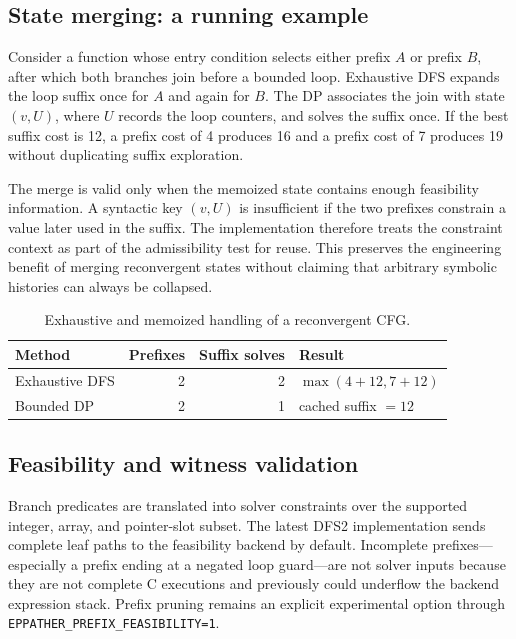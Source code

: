 \documentclass[10pt,conference]{IEEEtran}
\newcommand{\code}[1]{\texttt{#1}}
\begin{document}
\subsection{State merging: a running example}
Consider a function whose entry condition selects either prefix $A$ or prefix $B$, after which both branches join before a bounded loop. Exhaustive DFS expands the loop suffix once for $A$ and again for $B$. The DP associates the join with state $(v,U)$, where $U$ records the loop counters, and solves the suffix once. If the best suffix cost is 12, a prefix cost of 4 produces 16 and a prefix cost of 7 produces 19 without duplicating suffix exploration.

The merge is valid only when the memoized state contains enough feasibility information. A syntactic key $(v,U)$ is insufficient if the two prefixes constrain a value later used in the suffix. The implementation therefore treats the constraint context as part of the admissibility test for reuse. This preserves the engineering benefit of merging reconvergent states without claiming that arbitrary symbolic histories can always be collapsed.

\begin{table}[t]
\centering
\caption{Exhaustive and memoized handling of a reconvergent CFG.}
\label{tab:merge-example}
\begin{tabular}{lrrl}
\toprule
Method & Prefixes & Suffix solves & Result\\
\midrule
Exhaustive DFS & 2 & 2 & $\max(4+12,7+12)$\\
Bounded DP & 2 & 1 & cached suffix $=12$\\
\bottomrule
\end{tabular}
\end{table}

\subsection{Feasibility and witness validation}
Branch predicates are translated into solver constraints over the supported integer, array, and pointer-slot subset. The latest DFS2 implementation sends complete leaf paths to the feasibility backend by default. Incomplete prefixes---especially a prefix ending at a negated loop guard---are not solver inputs because they are not complete C executions and previously could underflow the backend expression stack. Prefix pruning remains an explicit experimental option through \code{EPPATHER\_PREFIX\_FEASIBILITY=1}.
\end{document}
